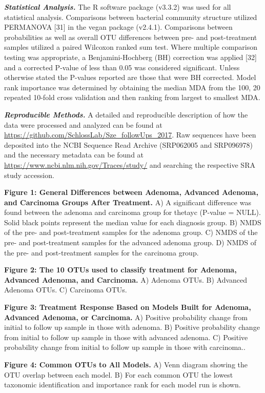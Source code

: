 \documentclass[12pt,]{article}
\begin{document}
\textbf{\emph{Statistical Analysis.}} The R software package (v3.3.2)
was used for all statistical analysis. Comparisons between bacterial
community structure utilized PERMANOVA {[}31{]} in the vegan package
(v2.4.1). Comparisons between probabilities as well as overall OTU
differences between pre- and post-treatment samples utilized a paired
Wilcoxon ranked sum test. Where multiple comparison testing was
appropriate, a Benjamini-Hochberg (BH) correction was applied {[}32{]}
and a corrected P-value of less than 0.05 was considered significant.
Unless otherwise stated the P-values reported are those that were BH
corrected. Model rank importance was determined by obtaining the median
MDA from the 100, 20 repeated 10-fold cross validation and then ranking
from largest to smallest MDA.

\textbf{\emph{Reproducible Methods.}} A detailed and reproducible
description of how the data were processed and analyzed can be found at
\url{https://github.com/SchlossLab/Sze_followUps_2017}. Raw sequences
have been deposited into the NCBI Sequence Read Archive (SRP062005 and
SRP096978) and the necessary metadata can be found at
\url{https://www.ncbi.nlm.nih.gov/Traces/study/} and searching the
respective SRA study accession.

\newpage

\textbf{Figure 1: General Differences between Adenoma, Advanced Adenoma,
and Carcinoma Groups After Treatment.} A) A significant difference was
found between the adenoma and carcinoma group for thetayc (P-value =
NULL). Solid black points represent the median value for each diagnosis
group. B) NMDS of the pre- and post-treatment samples for the adenoma
group. C) NMDS of the pre- and post-treatment samples for the advanced
adenoma group. D) NMDS of the pre- and post-treatment samples for the
carcinoma group.

\textbf{Figure 2: The 10 OTUs used to classify treatment for Adenoma,
Advanced Adenoma, and Carcinoma.} A) Adenoma OTUs. B) Advanced Adenoma
OTUs. C) Carcinoma OTUs.

\textbf{Figure 3: Treatment Response Based on Models Built for Adenoma,
Advanced Adenoma, or Carcinoma.} A) Positive probability change from
initial to follow up sample in those with adenoma. B) Positive
probability change from initial to follow up sample in those with
advanced adenoma. C) Positive probability change from initial to follow
up sample in those with carcinoma..

\textbf{Figure 4: Common OTUs to All Models.} A) Venn diagram showing
the OTU overlap between each model. B) For each common OTU the lowest
taxonomic identification and importance rank for each model run is
shown.
\end{document}
